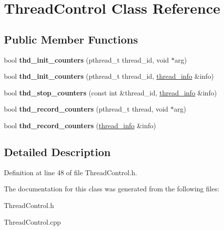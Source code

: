 \hypertarget{classThreadControl}{\section{Thread\-Control Class Reference}
\label{classThreadControl}
}
\subsection*{Public Member Functions}
\begin{DoxyCompactItemize}
\item 
\hypertarget{classThreadControl_a3815813a93f12ae7a699ff0bf3090c19}{bool {\bfseries thd\-\_\-init\-\_\-counters} (pthread\-\_\-t thread\-\_\-id, void $\ast$arg)}\label{classThreadControl_a3815813a93f12ae7a699ff0bf3090c19}

\item 
\hypertarget{classThreadControl_acf328e5da7324314bcc3380e6e75de95}{bool {\bfseries thd\-\_\-init\-\_\-counters} (pthread\-\_\-t thread\-\_\-id, \hyperlink{structthread__info}{thread\-\_\-info} \&info)}\label{classThreadControl_acf328e5da7324314bcc3380e6e75de95}

\item 
\hypertarget{classThreadControl_a27b61f21b34d679d262ac31fea1a0029}{bool {\bfseries thd\-\_\-stop\-\_\-counters} (const int \&thread\-\_\-id, \hyperlink{structthread__info}{thread\-\_\-info} \&info)}\label{classThreadControl_a27b61f21b34d679d262ac31fea1a0029}

\item 
\hypertarget{classThreadControl_a61d268caa2b8dd55ef1c412fa86ada25}{bool {\bfseries thd\-\_\-record\-\_\-counters} (pthread\-\_\-t thread, void $\ast$arg)}\label{classThreadControl_a61d268caa2b8dd55ef1c412fa86ada25}

\item 
\hypertarget{classThreadControl_ac2d690ddd11e212efad6b2381ad0cce4}{bool {\bfseries thd\-\_\-record\-\_\-counters} (\hyperlink{structthread__info}{thread\-\_\-info} \&info)}\label{classThreadControl_ac2d690ddd11e212efad6b2381ad0cce4}

\end{DoxyCompactItemize}


\subsection{Detailed Description}


Definition at line 48 of file Thread\-Control.\-h.



The documentation for this class was generated from the following files\-:\begin{DoxyCompactItemize}
\item 
Thread\-Control.\-h\item 
Thread\-Control.\-cpp\end{DoxyCompactItemize}
